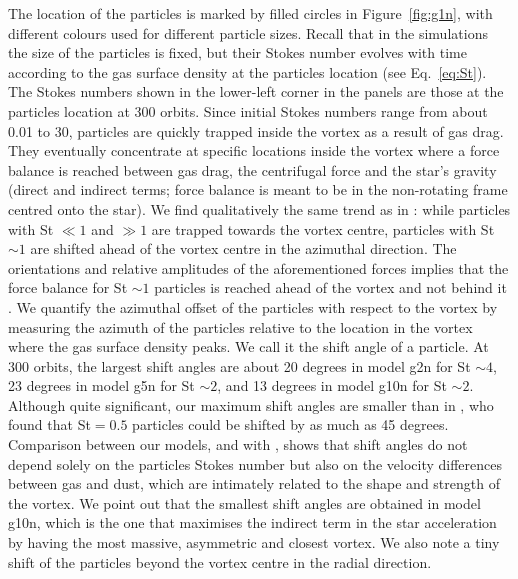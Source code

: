 \documentclass[a4paper,usenatbib]{mnras}
\begin{document}
The location of the particles is marked by filled circles in
Figure~\ref{fig:g1n}, with different colours used for different
particle sizes. Recall that in the simulations the size of the
particles is fixed, but their Stokes number evolves with time
according to the gas surface density at the particles location (see
Eq.~\ref{eq:St}).  The Stokes numbers shown in the lower-left corner
in the panels are those at the particles location at 300 orbits. Since
initial Stokes numbers range from about 0.01 to 30, particles are
quickly trapped inside the vortex as a result of gas drag. They
eventually concentrate at specific locations inside the vortex where a
force balance is reached between gas drag, the centrifugal force and
the star's gravity (direct and indirect terms; force balance is meant
to be in the non-rotating frame centred onto the star). We find
qualitatively the same trend as in \cite{MC15}: while particles with
St $\ll 1$ and $\gg 1$ are trapped towards the vortex centre,
particles with St $\sim 1$ are shifted ahead of the vortex centre in
the azimuthal direction. The orientations and relative amplitudes of
the aforementioned forces implies that the force balance for St $\sim
1$ particles is reached ahead of the vortex and not behind it
\citep[see the lower-right panel in figure 3 of][]{MC15}. We quantify
the azimuthal offset of the particles with respect to the vortex by
measuring the azimuth of the particles relative to the location in the
vortex where the gas surface density peaks. We call it the shift angle
of a particle. At 300 orbits, the largest shift angles are about 20
degrees in model g2n for St $\sim 4$, 23 degrees in model g5n for St
$\sim 2$, and 13 degrees in model g10n for St $\sim 2$. Although quite
significant, our maximum shift angles are smaller than in \cite{MC15},
who found that St$=0.5$ particles could be shifted by as much as 45
degrees.  Comparison between our models, and with \cite{MC15}, shows
that shift angles do not depend solely on the particles Stokes number
but also on the velocity differences between gas and dust, which are
intimately related to the shape and strength of the vortex. We point
out that the smallest shift angles are obtained in model g10n, which
is the one that maximises the indirect term in the star acceleration
by having the most massive, asymmetric and closest vortex. We also
note a tiny shift of the particles beyond the vortex centre in the
radial direction.
\end{document}
